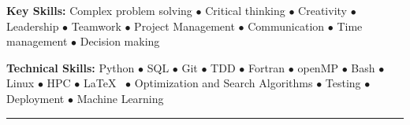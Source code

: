 \vspace*{-5mm}
\begin{multicols}{2}
    \begin{spacing}{1}
        \textcolor{my_blue}{\bf Key Skills:}
        Complex problem solving $\bullet$ Critical thinking $\bullet$ Creativity $\bullet$ Leadership $\bullet$ Teamwork $\bullet$ Project Management $\bullet$ Communication $\bullet$ Time management $\bullet$ Decision making

        \textcolor{my_blue}{\bf Technical Skills:}
        Python $\bullet$ SQL $\bullet$ Git $\bullet$ TDD $\bullet$ Fortran $\bullet$ openMP $\bullet$ Bash $\bullet$ Linux $\bullet$ HPC $\bullet$ \LaTeX~ $\bullet$ Optimization and Search Algorithms $\bullet$ Testing $\bullet$ Deployment $\bullet$ Machine Learning
    \end{spacing}
\end{multicols}

\vspace*{-8mm}
\begin{center}
    \par\rule{1.0\textwidth}{0.6pt}
\end{center}